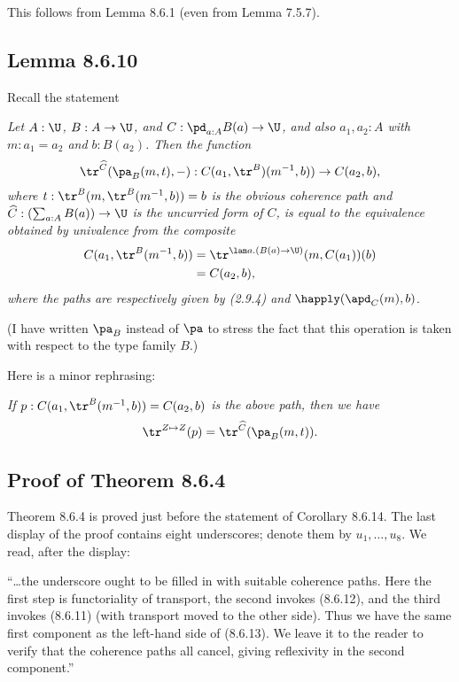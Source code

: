 \documentclass[12pt]{article}
\begin{document}
This follows from Lemma 8.6.1 (even from Lemma 7.5.7).


\subsection{Lemma 8.6.10}%

Recall the statement

\nn{} \emph{Let $A:\U$, $B:A\to \U$, and $C:\pd_{a:A} B(a)\to\U$, and also $a_1,a_2:A$ with $m:a_1=a_2$ and $b:B(a_2)$. Then the function
$$
\tr^{\widehat C}(\pa_B(m,t),-):C(a_1,\tr^B)(m^{-1},b))\to C(a_2,b),
$$ 
where $t:\tr^B(m,\tr^B(m^{-1},b))=b$ is the obvious coherence path and $\widehat C:(\sum_{a:A}B(a))\to\U$ is the uncurried form of $C$, is equal to the equivalence obtained by univalence from the composite 
\begin{align*}
C(a_1,\tr^B(m^{-1},b))
&=\tr^{\lam a.(B(a)\to\U)}(m,C(a_1))(b)\\
&=C(a_2,b),
\end{align*} 
where the paths are respectively given by (2.9.4) and} $\happly(\apd_C(m),b)$. 

(I have written $\pa_B$ instead of $\pa$ to stress the fact that this operation is taken with respect to the type family $B$.)

Here is a minor rephrasing: 

\nn\emph{If $p:C(a_1,\tr^B(m^{-1},b))=C(a_2,b)$ is the above path, then we have} 
\begin{equation*}%
\tr^{Z\mapsto Z}(p)=\tr^{\widehat C}(\pa_B(m,t)).
\end{equation*}


\subsection{Proof of Theorem 8.6.4}%

Theorem 8.6.4 is proved just before the statement of Corollary 8.6.14. The last display of the proof contains eight underscores; denote them by $u_1,\dots,u_8$. We read, after the display:

\nn``\dots the underscore ought to be filled in with suitable coherence paths. Here the first step is functoriality of transport, the second invokes (8.6.12), and the third invokes (8.6.11) (with transport moved to the other side). Thus we have the same first component as the left-hand side of (8.6.13). We leave it to the reader to verify that the coherence paths all cancel, giving reflexivity in the second component.''
\end{document}
